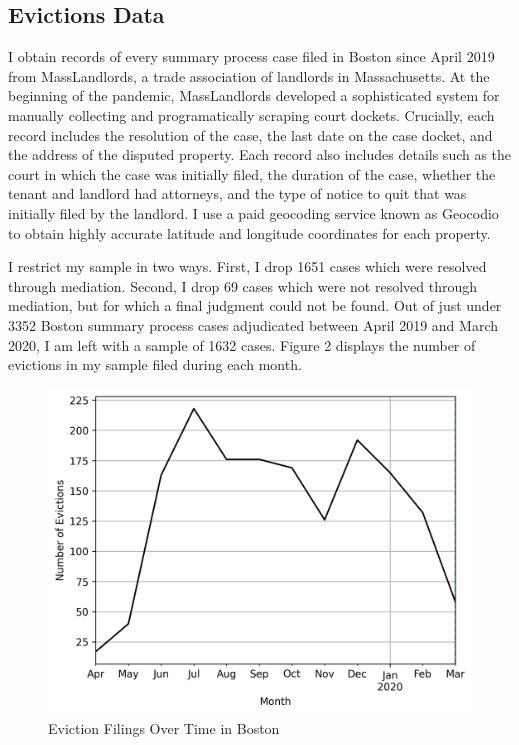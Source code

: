 \documentclass[12pt]{article}
\begin{document}
    \subsection{Evictions Data}
    I obtain records of every summary process case filed in Boston since April 2019 from MassLandlords, a trade association of landlords in Massachusetts. At the beginning of the pandemic, MassLandlords developed a sophisticated system for manually collecting and programatically scraping court dockets. Crucially, each record includes the resolution of the case, the last date on the case docket, and the address of the disputed property. Each record also includes details such as the court in which the case was initially filed, the duration of the case, whether the tenant and landlord had attorneys, and the type of notice to quit that was initially filed by the landlord. I use a paid geocoding service known as Geocodio to obtain highly accurate latitude and longitude coordinates for each property. 


    I restrict my sample in two ways. First, I drop 1651 cases which were resolved through mediation. Second, I drop 69 cases which were not resolved through mediation, but for which a final judgment could not be found. Out of just under 3352 Boston summary process cases adjudicated between April 2019 and March 2020, I am left with a sample of 1632 cases. Figure 2 displays the number of evictions in my sample filed during each month. 

        \begin{figure}[H]
            \centering
            \includegraphics{output/summary_statistics/figures/filings_over_time.png}
            \caption{Eviction Filings Over Time in Boston}
            \label{fig:my_label}
        \end{figure}
\end{document}
